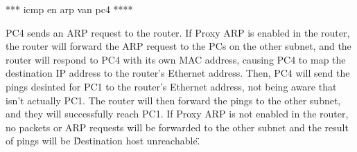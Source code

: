 *** icmp en arp van pc4 ****

PC4 sends an ARP request to the router. 
If Proxy ARP is enabled in the router, the router will forward the ARP request to the PCs on the other subnet, and the router will respond to PC4 with its own MAC address, causing PC4 to map the destination IP address to the router's Ethernet address. Then, PC4 will send the pings desinted for PC1 to the router's Ethernet address, not being aware that isn't actually PC1. The router will then forward the pings to the other subnet, and they will successfully reach PC1.
If Proxy ARP is not enabled in the router, no packets or ARP requests will be forwarded to the other subnet and the result of pings will be \"Destination host unreachable\".